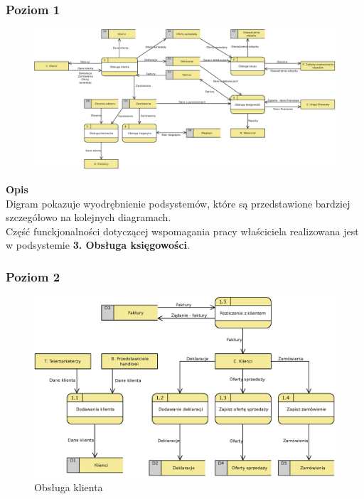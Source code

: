 \begin{landscape}
	\subsubsection{Poziom 1}
		\begin{figure}[H]
			\centering
			\centerline{\includegraphics[width=29cm]{img/DFD/1-level.eps}}
		\end{figure}
\end{landscape}

	\textbf{Opis}\\
	Digram pokazuje wyodrębnienie podsystemów, które są przedstawione bardziej szczegółowo na kolejnych diagramach.\\
	Część funckjonalności dotyczącej wspomagania pracy właściciela realizowana jest w podsystemie \textbf{3. Obsługa księgowości}.

	

\subsubsection{Poziom 2}

	\begin{figure}[H]
		\centering
		\centerline{\includegraphics[width=1.2\textwidth]{img/DFD/2-level-klient.eps}}
		\caption{Obsługa klienta}
	\end{figure}


